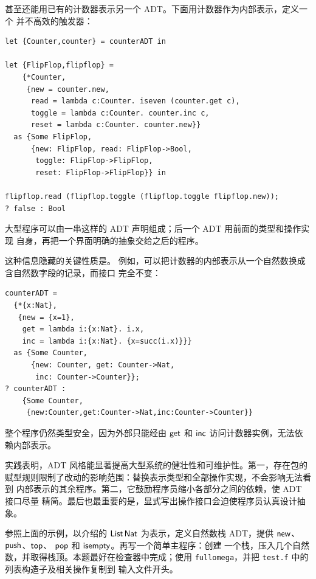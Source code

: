 甚至还能用已有的计数器表示另一个 ADT。下面用计数器作为内部表示，定义一个
并不高效的触发器：
\begin{lstlisting}
let {Counter,counter} = counterADT in

let {FlipFlop,flipflop} =
    {*Counter,
     {new = counter.new,
      read = lambda c:Counter. iseven (counter.get c),
      toggle = lambda c:Counter. counter.inc c,
      reset = lambda c:Counter. counter.new}}
  as {Some FlipFlop,
      {new: FlipFlop, read: FlipFlop->Bool,
       toggle: FlipFlop->FlipFlop,
       reset: FlipFlop->FlipFlop}} in

flipflop.read (flipflop.toggle (flipflop.toggle flipflop.new));
? false : Bool
\end{lstlisting}
大型程序可以由一串这样的 ADT 声明组成；后一个 ADT 用前面的类型和操作实现
自身，再把一个界面明确的抽象交给之后的程序。

这种信息隐藏的关键性质是。
例如，可以把计数器的内部表示从一个自然数换成含自然数字段的记录，而接口
完全不变：
\begin{lstlisting}
counterADT =
  {*{x:Nat},
   {new = {x=1},
    get = lambda i:{x:Nat}. i.x,
    inc = lambda i:{x:Nat}. {x=succ(i.x)}}}
  as {Some Counter,
      {new: Counter, get: Counter->Nat,
       inc: Counter->Counter}};
? counterADT :
    {Some Counter,
     {new:Counter,get:Counter->Nat,inc:Counter->Counter}}
\end{lstlisting}
整个程序仍然类型安全，因为外部只能经由 \(\mathsf{get}\) 和
\(\mathsf{inc}\) 访问计数器实例，无法依赖内部表示。

实践表明，ADT 风格能显著提高大型系统的健壮性和可维护性。第一，存在包的
赋型规则限制了改动的影响范围：替换表示类型和全部操作实现，不会影响无法看到
内部表示的其余程序。第二，它鼓励程序员缩小各部分之间的依赖，使 ADT 接口尽量
精简。最后也最重要的是，显式写出操作接口会迫使程序员认真设计抽象。

\begin{exercise}
\label{ex:24.2.1}
参照上面的示例，以介绍的
\(\mathsf{List}\,\mathsf{Nat}\) 为表示，定义自然数栈 ADT，提供
\(\mathsf{new}\)、\(\mathsf{push}\)、\(\mathsf{top}\)、
\(\mathsf{pop}\) 和 \(\mathsf{isempty}\)。再写一个简单主程序：创建
一个栈，压入几个自然数，并取得栈顶。本题最好在检查器中完成；使用
\texttt{fullomega}，并把 \texttt{test.f} 中的列表构造子及相关操作复制到
输入文件开头。
\end{exercise}

